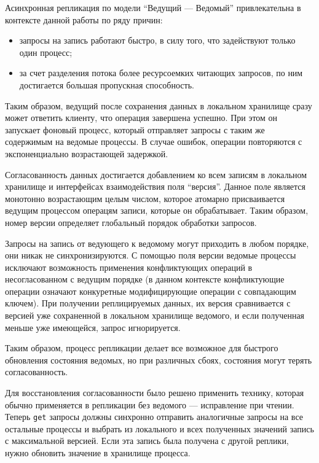 \documentclass[14pt, russian]{scrartcl}
\begin{document}
Асинхронная репликация по модели ``Ведущий --- Ведомый'' привлекательна в
контексте данной работы по ряду причин:

\begin{itemize}
  \item запросы на запись работают быстро, в силу того, что задействуют только
        один процесс;
  \item за счет разделения потока более ресурсоемких читающих запросов, по ним
        достигается большая пропускная способность.
\end{itemize}

Таким образом, ведущий после сохранения данных в локальном хранилище сразу может
ответить клиенту, что операция завершена успешно. При этом он запускает фоновый
процесс, который отправляет запросы с таким же содержимым на ведомые процессы. В
случае ошибок, операции повторяются с экспоненциально возрастающей задержкой.

Согласованность данных достигается добавлением ко всем записям в локальном
хранилище и интерфейсах взаимодействия поля ``версия''. Данное поле является
монотонно возрастающим целым числом, которое атомарно присваивается ведущим
процессом операцям записи, которые он обрабатывает. Таким образом, номер версии
определяет глобальный порядок обработки запросов.

Запросы на запись от ведующего к ведомому могут приходить в любом порядке, они
никак не синхронизируются. С помощью поля версии ведомые процессы исключают
возможность применения конфликтующих операций в несогласованном с ведущим
порядке (в данном контексте конфликтующие операции означают конкуретные
модифицирующие операции с совпадающим ключем). При получении реплицируемых
данных, их версия сравнивается с версией уже сохраненной в локальном хранилище
ведомого, и если полученная меньше уже имеющейся, запрос игнорируется.

Таким образом, процесс репликации делает все возможное для быстрого обновления
состояния ведомых, но при различных сбоях, состояния могут терять
согласованность.

Для восстановления согласованности было решено применить технику, которая обычно
применяется в репликации без ведомого --- исправление при чтении. Теперь
\verb|get| запросы должны синхронно отправить аналогичные запросы на все
остальные процессы и выбрать из локального и всех полученных значений запись с
максимальной версией. Если эта запись была получена с другой реплики, нужно
обновить значение в хранилище процесса.
\end{document}

